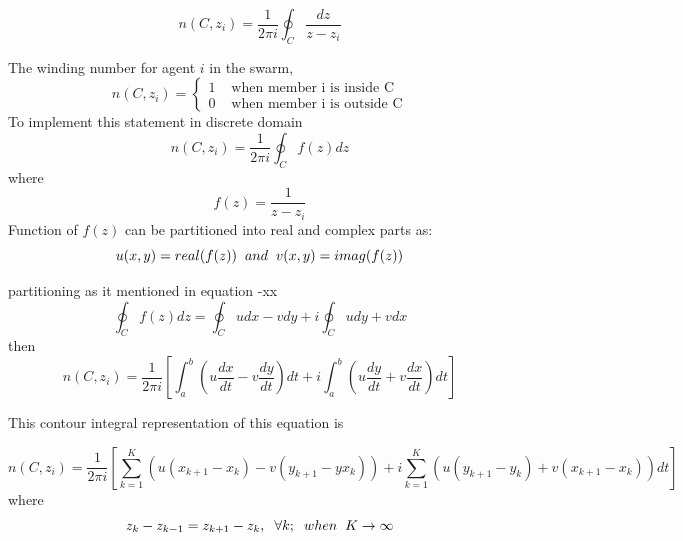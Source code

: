 \documentclass[twoside]{article}
\begin{document}
		\begin{equation}
 n(C,z_i) = \frac{1}{2\pi i}\oint_C \frac{dz}{z-z_i}
 		\end{equation}
		
		The winding number for agent $i$ in the swarm,
\begin{equation}
n(C,z_i) = \left\{ \begin{array}{rl}
1 &\mbox{ when member i is inside C} \\
0 &\mbox{ when member i is outside C}
\end{array} \right.
\end{equation}
		To implement this statement in discrete domain 
		\begin{equation}
n(C,z_i) = \frac{1}{2\pi i} \oint_C f(z)dz
		\end{equation}
		where 
		\begin{equation}
f(z) = \frac{1}{z-z_i}
		\end{equation}
		Function of $f(z)$ can be partitioned into real and complex parts as:
		\begin{equation}
u(x,y) = real(f(z))  \hspace{0.2cm} and \hspace{0.2cm} v(x,y) = imag(f(z))
		\end{equation}
		
		partitioning as it mentioned in equation -xx
		\begin{equation}
\oint_C f(z)dz  = \oint_C u dx - v dy + i \oint_C u dy + v dx 
		\end{equation}
		then
		\begin{equation}
n(C,z_i)  = \frac{1}{2\pi i} \left[\int_{a}^{b} \left(u\frac{dx}{dt} - v\frac{dy}{dt}\right)dt + i\int_{a}^{b}\left(u\frac{dy}{dt} + v\frac{dx}{dt}\right)dt\right]
		\end{equation}
		
		This contour integral representation of this equation is
		
		\begin{equation}
n(C,z_i)  = \frac{1}{2\pi i} \left[\sum_{k=1}^{K} \left(u(x_{k+1} - x_k ) - v(y_{k+1} -yx_k )\right) + i\sum_{k=1}^{K}\left(u(y_{k+1} - y_k ) + v(x_{k+1} - x_k )\right)dt\right]
		\end{equation}
		where
		\begin{equation}
z_k - z_{k-1} = z_{k+1} - z_k, \hspace{0.2cm}  \forall k ;  \hspace{0.2cm} when  \hspace{0.2cm} K \to\infty
		\end{equation}
\end{document}

